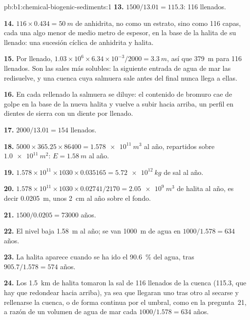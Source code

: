 \begin{solution}{pb:b1:chemical-biogenic-sediments:1}
\textbf{13.} $1500/13.01 = 115.3$: 116 llenados.

\textbf{14.} $116\times0.434 = \qty{50}{m}$ de anhidrita, no como un estrato, sino como 116 capas, cada una algo menor de medio metro de espesor, en la base de la halita de su llenado: una sucesión cíclica de anhidrita y halita.

\textbf{15.} Por llenado, $1.03\times10^6\times6.34\times10^{-3}/2000 =
\qty{3.3}{m}$, así que \qty{379}{m} para 116 llenados. Son las sales más solubles: la siguiente entrada de agua de mar las redisuelve, y una cuenca cuya salmuera sale antes del final nunca llega a ellas.

\textbf{16.} En cada rellenado la salmuera se diluye: el contenido de bromuro cae de golpe en la base de la nueva halita y vuelve a subir hacia arriba, un perfil en dientes de sierra con un diente por llenado.

\textbf{17.} $2000/13.01 = 154$ llenados.

\textbf{18.} $5000\times365.25\times86400 = \qty{1.578e11}{m^3}$ al año, repartidos sobre $\qty{1.0e11}{m^2}$: $E = \qty{1.58}{m}$ al año.

\textbf{19.} $1.578\times10^{11}\times1030\times0.035165 = \qty{5.72e12}{kg}$ de sal al año.

\textbf{20.} $1.578\times10^{11}\times1030\times0.02741/2170 =
\qty{2.05e9}{m^3}$ de halita al año, es decir \qty{0.0205}{m}, unos \qty{2}{cm} al año sobre el fondo.

\textbf{21.} $1500/0.0205 = \num{73000}$ años.

\textbf{22.} El nivel baja \qty{1.58}{m} al año; se van \qty{1000}{m} de agua en $1000/1.578 = 634$ años.

\textbf{23.} La halita aparece cuando se ha ido el \qty{90.6}{\%} del agua, tras $905.7/1.578 = 574$ años.

\textbf{24.} Los \qty{1.5}{km} de halita tomaron la sal de 116 llenados de la cuenca (115.3, que hay que redondear hacia arriba), ya sea que llegaran uno tras otro al secarse y rellenarse la cuenca, o de forma continua
por el umbral, como en la pregunta~21, a razón de un volumen de agua de mar cada $1000/1.578 = 634$ años.
\end{solution}
